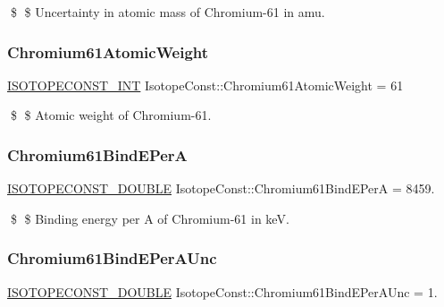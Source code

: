 \$ \$ Uncertainty in atomic mass of Chromium-\/61 in amu. \mbox{\label{group___isotope_const-_chromium-_cr61_gaa902fa1961b8aa38f1dc0eba24b76480}} 
\subsubsection{\texorpdfstring{Chromium61\+Atomic\+Weight}{Chromium61AtomicWeight}}
{\footnotesize\ttfamily \mbox{\hyperlink{group___isotope_const-_macros_ga5f18360b3e99483a35c32d789e62621c}{I\+S\+O\+T\+O\+P\+E\+C\+O\+N\+S\+T\+\_\+\+I\+NT}} Isotope\+Const\+::\+Chromium61\+Atomic\+Weight = 61}

\$ \$ Atomic weight of Chromium-\/61. \mbox{\label{group___isotope_const-_chromium-_cr61_ga3b0d38b559dd47cdd843cddf15f0d3b1}} 
\subsubsection{\texorpdfstring{Chromium61\+Bind\+E\+PerA}{Chromium61BindEPerA}}
{\footnotesize\ttfamily \mbox{\hyperlink{group___isotope_const-_macros_ga8f45a7272ce02c0b4c65c44636ed719a}{I\+S\+O\+T\+O\+P\+E\+C\+O\+N\+S\+T\+\_\+\+D\+O\+U\+B\+LE}} Isotope\+Const\+::\+Chromium61\+Bind\+E\+PerA = 8459.}

\$ \$ Binding energy per A of Chromium-\/61 in keV. \mbox{\label{group___isotope_const-_chromium-_cr61_ga5ea738f29408414254761391e37a7da7}} 
\subsubsection{\texorpdfstring{Chromium61\+Bind\+E\+Per\+A\+Unc}{Chromium61BindEPerAUnc}}
{\footnotesize\ttfamily \mbox{\hyperlink{group___isotope_const-_macros_ga8f45a7272ce02c0b4c65c44636ed719a}{I\+S\+O\+T\+O\+P\+E\+C\+O\+N\+S\+T\+\_\+\+D\+O\+U\+B\+LE}} Isotope\+Const\+::\+Chromium61\+Bind\+E\+Per\+A\+Unc = 1.}

